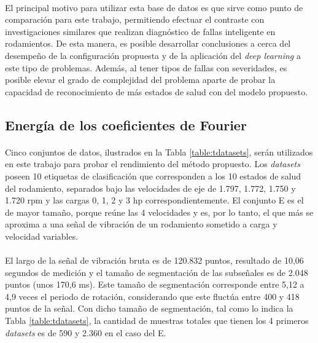 \documentclass[12pt]{article}%
\begin{document}
\paragraph{}
El principal motivo para utilizar esta base de datos es que sirve como punto de comparación para este trabajo, permitiendo efectuar el contraste con investigaciones similares que realizan diagnóstico de fallas inteligente en rodamientos. De esta manera, es posible desarrollar conclusiones a cerca del desempeño de la configuración propuesta y de la aplicación del \textit{deep learning} a este tipo de problemas. Además, al tener tipos de fallas con severidades, es posible elevar el grado de complejidad del problema aparte de probar la capacidad de reconocimiento de más estados de salud con del modelo propuesto.

\subsection{Energía de los coeficientes de Fourier}
\label{sec:datasets}

\paragraph{}
Cinco conjuntos de datos, ilustrados en la Tabla \ref{table:tdatasets}, serán utilizados en este trabajo para probar el rendimiento del método propuesto. Los \textit{datasets} poseen 10 etiquetas de clasificación que corresponden a los 10 estados de salud del rodamiento, separados bajo las velocidades de eje de 1.797, 1.772, 1.750 y 1.720 rpm y las cargas 0, 1, 2 y 3 hp correspondientemente. El conjunto E es el de mayor tamaño, porque reúne las 4 velocidades y es, por lo tanto, el que más se aproxima a una señal de vibración de un rodamiento sometido a carga y velocidad variables.

\paragraph{}
El largo de la señal de vibración bruta es de 120.832 puntos, resultado de 10,06 segundos de medición y el tamaño de segmentación de las subseñales es de 2.048 puntos (unos 170,6 ms). Este tamaño de segmentación corresponde entre 5,12 a 4,9 veces el periodo de rotación, considerando que este fluctúa entre 400 y 418 puntos de la señal. Con dicho tamaño de segmentación, tal como lo indica la Tabla \ref{table:tdatasets}, la cantidad de muestras totales que tienen los 4 primeros \textit{datasets} es de 590 y 2.360 en el caso del E.
\end{document}
